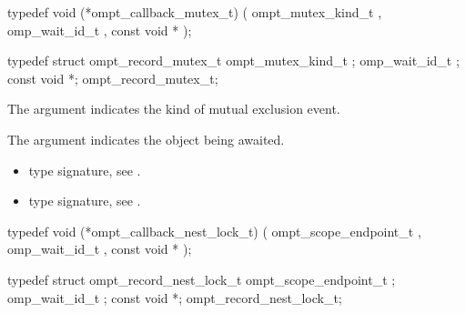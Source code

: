 \label{sec:ompt_callback_mutex_t}
\format

\begin{ccppspecific}
\begin{omptCallback}
typedef void (*ompt_callback_mutex_t) (
  ompt_mutex_kind_t ,
  omp_wait_id_t ,
  const void *
);
\end{omptCallback}
\end{ccppspecific}


\record

\begin{ccppspecific}
\begin{omptRecord}
typedef struct ompt_record_mutex_t {
  ompt_mutex_kind_t ;
  omp_wait_id_t ;
  const void *;
} ompt_record_mutex_t;
\end{omptRecord}
\end{ccppspecific}


\argdesc

The argument  indicates the kind of mutual exclusion event.

The argument  indicates the object being awaited. 

\codeptrdesc

\crossreferences
\begin{itemize}
\item {} type signature, see
.
\item {} type signature, see
.
\end{itemize}



\label{sec:ompt_callback_nest_lock_t}
\format

\begin{ccppspecific}
\begin{omptCallback}
typedef void (*ompt_callback_nest_lock_t) (
  ompt_scope_endpoint_t ,
  omp_wait_id_t ,
  const void *
);
\end{omptCallback}
\end{ccppspecific}


\record

\begin{ccppspecific}
\begin{omptRecord}
typedef struct ompt_record_nest_lock_t {
  ompt_scope_endpoint_t ;
  omp_wait_id_t ;
  const void *;
} ompt_record_nest_lock_t;
\end{omptRecord}
\end{ccppspecific}


